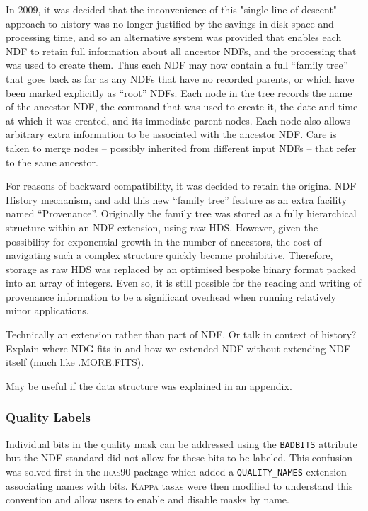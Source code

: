 \documentclass[final,authoryear,5p,times,twocolumn]{elsarticle}
\begin{document}
{In 2009, it was decided that the inconvenience of this "single line of
descent" approach to history was no longer justified by the savings in
disk space and processing time, and so an alternative system was
provided that enables each NDF to retain full information about all
ancestor NDFs, and the processing that was used to create them. Thus
each NDF may now contain a full ``family tree'' that goes back as far as
any NDFs that have no recorded parents, or which have been marked
explicitly as ``root'' NDFs. Each node in the tree records the name of
the ancestor NDF, the command that was used to create it, the date and
time at which it was created, and its immediate parent nodes. Each
node also allows arbitrary extra information to be associated with the
ancestor NDF. Care is taken to merge nodes -- possibly inherited from
different input NDFs -- that refer to the same ancestor.

For reasons of backward compatibility, it was decided to retain the
original NDF History mechanism, and add this new ``family tree'' feature
as an extra facility named ``Provenance''.  Originally the family tree
was stored as a fully hierarchical structure within an NDF extension,
using raw HDS. However, given the possibility for exponential growth
in the number of ancestors, the cost of navigating such a complex
structure quickly became prohibitive. Therefore, storage as raw HDS
was replaced by an optimised bespoke binary format packed into an
array of integers. Even so, it is still possible for the reading and
writing of provenance information to be a significant overhead when
running relatively minor applications.

{\color{red} Technically an extension rather than part of NDF. Or talk
  in context of history? Explain where NDG fits in and how we extended
  NDF without extending NDF itself (much like .MORE.FITS).}

{\color{red} May be useful if the data structure was explained in an appendix.}

\subsubsection{Quality Labels}

Individual bits in the quality mask can be addressed using the
\texttt{BADBITS} attribute but the NDF standard did not allow for
these bits to be labeled. This confusion was solved first in the
\textsc{iras90} package which added a \texttt{QUALITY\_NAMES}
extension associating names with bits. \textsc{Kappa} tasks were then
modified to understand this convention and allow users to enable and
disable masks by name.

}
\end{document}
